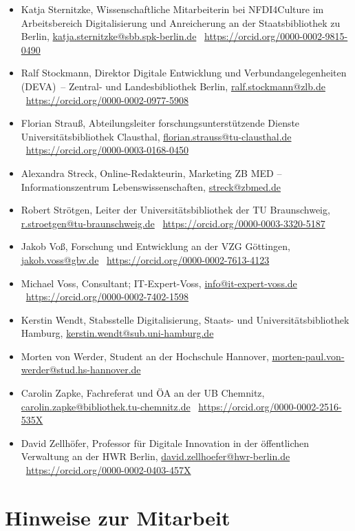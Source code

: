 \documentclass[
  11pt,
  letterpaper,
  DIV=11,
  twoside]{scrreprt}
\begin{document}
\begin{itemize}
\item
  Katja Sternitzke, Wissenschaftliche Mitarbeiterin bei NFDI4Culture im
  Arbeitsbereich Digitalisierung und Anreicherung an der
  Staatsbibliothek zu Berlin, \url{katja.sternitzke@sbb.spk-berlin.de}
  \orcidlogo~\url{https://orcid.org/0000-0002-9815-0490}
\item
  Ralf Stockmann, Direktor Digitale Entwicklung und
  Verbundangelegenheiten (DEVA)~-- Zentral- und Landesbibliothek Berlin,
  \url{ralf.stockmann@zlb.de}
  \orcidlogo~\url{https://orcid.org/0000-0002-0977-5908}
\item
  Florian Strauß, Abteilungsleiter forschungsunterstützende Dienste
  Universitätsbibliothek Clausthal,
  \url{florian.strauss@tu-clausthal.de}
  \orcidlogo~\url{https://orcid.org/0000-0003-0168-0450}
\item
  Alexandra Streck, Online-Redakteurin, Marketing ZB MED --
  Informationszentrum Lebenswissenschaften, \url{streck@zbmed.de}
\item
  Robert Strötgen, Leiter der Universitätsbibliothek der TU
  Braunschweig, \url{r.stroetgen@tu-braunschweig.de}
  \orcidlogo~\url{https://orcid.org/0000-0003-3320-5187}
\item
  Jakob Voß, Forschung und Entwicklung an der VZG Göttingen,
  \url{jakob.voss@gbv.de}
  \orcidlogo~\url{https://orcid.org/0000-0002-7613-4123}
\item
  Michael Voss, Consultant; IT-Expert-Voss, \url{info@it-expert-voss.de}
  \orcidlogo~\url{https://orcid.org/0000-0002-7402-1598}
\item
  Kerstin Wendt, Stabsstelle Digitalisierung, Staats- und
  Universitätsbibliothek Hamburg, \url{kerstin.wendt@sub.uni-hamburg.de}
\item
  Morten von Werder, Student an der Hochschule Hannover,
  \url{morten-paul.von-werder@stud.hs-hannover.de}
\item
  Carolin Zapke, Fachreferat und ÖA an der UB Chemnitz,
  \url{carolin.zapke@bibliothek.tu-chemnitz.de}
  \orcidlogo~\url{https://orcid.org/0000-0002-2516-535X}
\item
  David Zellhöfer, Professor für Digitale Innovation in der öffentlichen
  Verwaltung an der HWR Berlin, \url{david.zellhoefer@hwr-berlin.de}
  \orcidlogo~\url{https://orcid.org/0000-0002-0403-457X}
\end{itemize}

\chapter{Hinweise zur Mitarbeit}\label{sec-mitarbeit}
\end{document}
